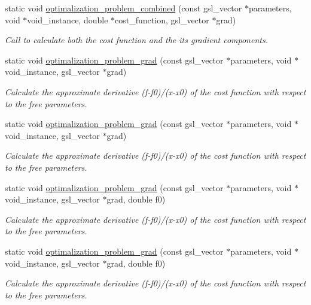 \begin{DoxyCompactItemize}
static void \hyperlink{class_sub___matrix___decomposition_a809f1ef599059bc78d7ce569b219d7eb}{optimalization\+\_\+problem\+\_\+combined} (const gsl\+\_\+vector $\ast$parameters, void $\ast$void\+\_\+instance, double $\ast$cost\+\_\+function, gsl\+\_\+vector $\ast$grad)
\begin{DoxyCompactList}\small\item\em Call to calculate both the cost function and the its gradient components. \end{DoxyCompactList}\item 
static void \hyperlink{class_sub___matrix___decomposition_a8ba9ff25e30fc416363806401bb2362a}{optimalization\+\_\+problem\+\_\+grad} (const gsl\+\_\+vector $\ast$parameters, void $\ast$void\+\_\+instance, gsl\+\_\+vector $\ast$grad)
\begin{DoxyCompactList}\small\item\em Calculate the approximate derivative (f-\/f0)/(x-\/x0) of the cost function with respect to the free parameters. \end{DoxyCompactList}\item 
static void \hyperlink{class_sub___matrix___decomposition_a290b68ba2fad388b635800d00b37d125}{optimalization\+\_\+problem\+\_\+grad} (const gsl\+\_\+vector $\ast$parameters, void $\ast$void\+\_\+instance, gsl\+\_\+vector $\ast$grad)
\begin{DoxyCompactList}\small\item\em Calculate the approximate derivative (f-\/f0)/(x-\/x0) of the cost function with respect to the free parameters. \end{DoxyCompactList}\item 
static void \hyperlink{class_sub___matrix___decomposition_aa74b77aa48c9a54669d10a06c5022e31}{optimalization\+\_\+problem\+\_\+grad} (const gsl\+\_\+vector $\ast$parameters, void $\ast$void\+\_\+instance, gsl\+\_\+vector $\ast$grad, double f0)
\begin{DoxyCompactList}\small\item\em Calculate the approximate derivative (f-\/f0)/(x-\/x0) of the cost function with respect to the free parameters. \end{DoxyCompactList}\item 
static void \hyperlink{class_sub___matrix___decomposition_a7aeb313fcab51d95dd2ee88120f28168}{optimalization\+\_\+problem\+\_\+grad} (const gsl\+\_\+vector $\ast$parameters, void $\ast$void\+\_\+instance, gsl\+\_\+vector $\ast$grad, double f0)
\begin{DoxyCompactList}\small\item\em Calculate the approximate derivative (f-\/f0)/(x-\/x0) of the cost function with respect to the free parameters. \end{DoxyCompactList}\end{DoxyCompactItemize}
